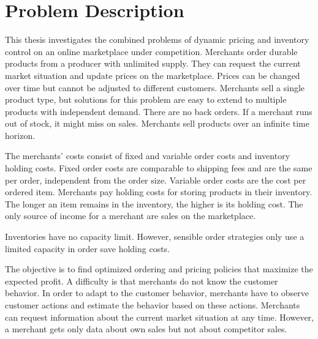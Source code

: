 
\chapter{Problem Description}
This thesis investigates the combined problems of dynamic pricing and inventory control on an online marketplace under competition.
Merchants order durable products from a producer with unlimited supply. 
They can request the current market situation and update prices on the marketplace.
Prices can be changed over time but cannot be adjusted to different customers.
Merchants sell a single product type, but solutions for this problem are easy to extend to multiple products with independent demand.
There are no back orders. If a merchant runs out of stock, it might miss on sales.
Merchants sell products over an infinite time horizon.

The merchants' costs consist of fixed and variable order costs and inventory holding costs.
Fixed order costs are comparable to shipping fees and are the same per order, independent from the order size.
Variable order costs are the cost per ordered item.
Merchants pay holding costs for storing products in their inventory.
The longer an item remains in the inventory, the higher is its holding cost. 
The only source of income for a merchant are sales on the marketplace.

Inventories have no capacity limit.
However, sensible order strategies only use a limited capacity in order save holding costs.

The objective is to find optimized ordering and pricing policies that maximize the expected profit.
A difficulty is that merchants do not know the customer behavior.
In order to adapt to the customer behavior, merchants have to observe customer actions and estimate the behavior based on these actions.
Merchants can request information about the current market situation at any time.
However, a merchant gets only data about own sales but not about competitor sales.
